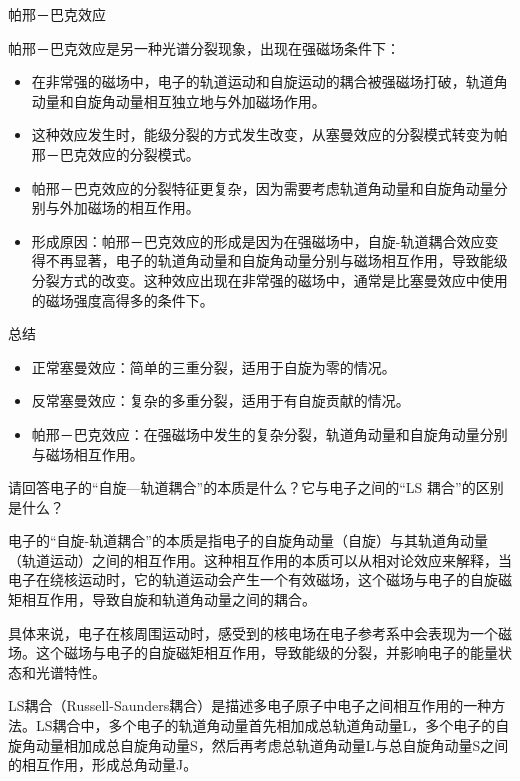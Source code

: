 \documentclass[dvipsnames, svgnames,a4paper,11pt]{article}
\begin{document}
	帕邢－巴克效应

	帕邢－巴克效应是另一种光谱分裂现象，出现在强磁场条件下：

		\begin{itemize}
			\item 在非常强的磁场中，电子的轨道运动和自旋运动的耦合被强磁场打破，轨道角动量和自旋角动量相互独立地与外加磁场作用。
			\item 这种效应发生时，能级分裂的方式发生改变，从塞曼效应的分裂模式转变为帕邢－巴克效应的分裂模式。
			\item 帕邢－巴克效应的分裂特征更复杂，因为需要考虑轨道角动量和自旋角动量分别与外加磁场的相互作用。
			\item 形成原因：帕邢－巴克效应的形成是因为在强磁场中，自旋-轨道耦合效应变得不再显著，电子的轨道角动量和自旋角动量分别与磁场相互作用，导致能级分裂方式的改变。这种效应出现在非常强的磁场中，通常是比塞曼效应中使用的磁场强度高得多的条件下。
		\end{itemize}


	总结
	\begin{itemize}
		\item 正常塞曼效应：简单的三重分裂，适用于自旋为零的情况。
		\item 反常塞曼效应：复杂的多重分裂，适用于有自旋贡献的情况。
		\item 帕邢－巴克效应：在强磁场中发生的复杂分裂，轨道角动量和自旋角动量分别与磁场相互作用。
	\end{itemize}








\begin{question}
	请回答电子的“自旋—轨道耦合”的本质是什么？它与电子之间的“LS 耦合”的区别是什么？
\end{question}


	电子的“自旋-轨道耦合”的本质是指电子的自旋角动量（自旋）与其轨道角动量（轨道运动）之间的相互作用。这种相互作用的本质可以从相对论效应来解释，当电子在绕核运动时，它的轨道运动会产生一个有效磁场，这个磁场与电子的自旋磁矩相互作用，导致自旋和轨道角动量之间的耦合。

	具体来说，电子在核周围运动时，感受到的核电场在电子参考系中会表现为一个磁场。这个磁场与电子的自旋磁矩相互作用，导致能级的分裂，并影响电子的能量状态和光谱特性。

	LS耦合（Russell-Saunders耦合）是描述多电子原子中电子之间相互作用的一种方法。LS耦合中，多个电子的轨道角动量首先相加成总轨道角动量L，多个电子的自旋角动量相加成总自旋角动量S，然后再考虑总轨道角动量L与总自旋角动量S之间的相互作用，形成总角动量J。
\end{document}
